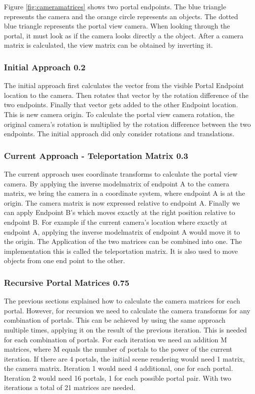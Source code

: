Figure \ref{fig:cameramatrices} shows two portal endpoints. The blue triangle represents the camera and the orange circle represents an objects. The dotted blue triangle represents the portal view camera.
When looking through the portal, it must look as if the camera looks directly a the object. After a camera matrix is calculated, the view matrix can be obtained by inverting it.

\subsubsection{Initial Approach 0.2}
The initial approach first calculates the vector from the visible Portal Endpoint location to the camera. Then rotates that vector by the rotation difference of the two endpoints. Finally that vector gets added to the other Endpoint location. This is new camera origin.
To calculate the portal view camera rotation, the original camera's rotation is multiplied by the rotation difference between the two endpoints.
The initial approach did only consider rotations and translations.

\subsubsection{Current Approach - Teleportation Matrix 0.3}
The current approach uses coordinate transforms to calculate the portal view camera. By applying the inverse modelmatrix of endpoint A to the camera matrix, we bring the camera in a coordinate system, where endpoint A is at the origin. The camera matrix is now expressed relative to endpoint A. Finally we can apply Endpoint B's which moves exactly at the right position relative to endpoint B.
For example if the current camera's location where exactly at endpoint A, applying the inverse modelmatrix of endpoint A would move it to the origin.
The Application of the two matrices can be combined into one. The implementation this is called the teleportation matrix. It is also used to move objects from one end point to the other.  


\subsubsection{Recursive Portal Matrices 0.75}
The previous sections explained how to calculate the camera matrices for each portal. However, for recursion we need to calculate the camera transforms for any combination of portals. This can be achieved by using the same approach multiple times, applying it on the result of the previous iteration. This is needed for each combination of portals. For each iteration we need an addition M matrices, where M equals the number of portals to the power of the current iteration. If there are 4 portals, the initial scene rendering would need 1 matrix, the camera matrix. Iteration 1 would need 4 additional, one for each portal. Iteration 2 would need 16 portals, 1 for each possible portal pair. With two iterations a total of 21 matrices are needed.

